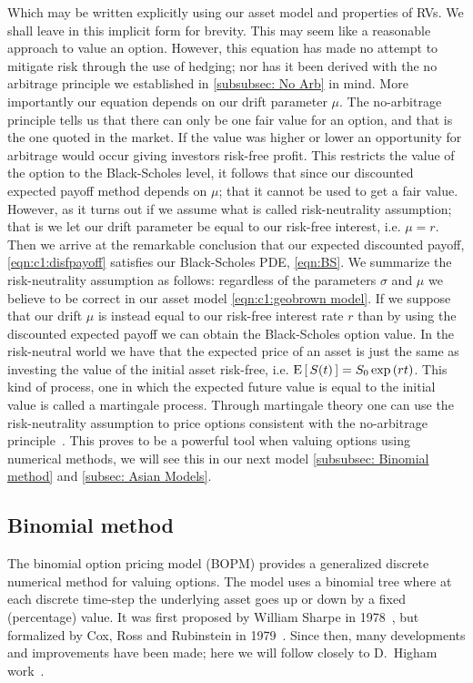 Which may be written explicitly using our asset model and properties of RVs. We shall leave in this implicit form for brevity. This may seem like a reasonable approach to value an option. However, this equation has made no attempt to mitigate risk through the use of hedging; nor has it been derived with the no arbitrage principle we established in \autoref{subsubsec: No Arb} in mind. More importantly our equation depends on our drift parameter \(\mu \).
\nline{}
The no-arbitrage principle tells us that there can only be one fair value for an option, and that is the one quoted in the market. If the value was higher or lower an opportunity for arbitrage would occur giving investors risk-free profit. This restricts the value of the option to the Black-Scholes level, it follows that since our discounted expected payoff method depends on \(\mu \); that it cannot be used to get a fair value.
\nline{}
However, as it turns out if we assume what is called risk-neutrality assumption; that is we let our drift parameter be equal to our risk-free interest, i.e. \(\mu = r\). Then we arrive at the remarkable conclusion that our expected discounted payoff, \autoref{eqn:c1:disfpayoff} satisfies our Black-Scholes PDE, \autoref{eqn:BS}.
\nline{}
We summarize the risk-neutrality assumption as follows: regardless of the parameters \(\sigma\) and \(\mu\) we believe to be correct in our asset model \autoref{eqn:c1:geobrown model}. If we suppose that our drift \(\mu\) is instead equal to our risk-free interest rate \(r\) than by using the discounted expected payoff we can obtain the Black-Scholes option value. 
\nline{}
In the risk-neutral world we have that the expected price of an asset is just the same as investing the value of the initial asset risk-free, i.e. \(\text{E}\left[\,S(t)\,\right] = S_0\exp\left(rt\right)\). This kind of process, one in which the expected future value is equal to the initial value is called a martingale process. Through martingale theory one can use the risk-neutrality assumption to price options consistent with the no-arbitrage principle~\cite{kritzman2000puzzles}. This proves to be a powerful tool when valuing options using numerical methods, we will see this in our next model \autoref{subsubsec: Binomial method} and \autoref{subsec: Asian Models}.

\subsection{Binomial method}\label{subsubsec: Binomial method}

The binomial option pricing model (BOPM) provides a generalized discrete numerical method for valuing options. The model uses a binomial tree where at each discrete time-step the underlying asset goes up or down by a fixed (percentage) value. It was first proposed by William Sharpe in 1978~\cite{sharpe1978investments}, but formalized by Cox, Ross and Rubinstein in 1979~\cite{COX1979229}. Since then, many developments and improvements have been made; here we will follow closely to D.~Higham work~\cite{higham2004introduction}.

